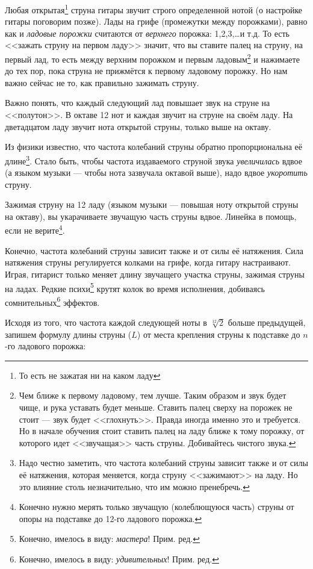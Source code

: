 Любая открытая\footnote{То есть не зажатая ни на каком ладу} струна гитары звучит строго определенной нотой (о настройке гитары поговорим позже). Лады на грифе (промежутки между порожками), равно как и \emph{ладовые порожки} считаются от \emph{верхнего} порожка: 1,2,3,\ldots и т.д. То есть <<зажать струну на первом ладу>> значит, что вы ставите палец на струну, на первый лад, то есть между верхним порожком и первым ладовым\footnote{Чем ближе к первому ладовому, тем лучше. Таким образом и звук будет чище, и рука уставать будет меньше. Ставить палец сверху на порожек не стоит --- звук будет <<глохнуть>>. Правда иногда именно это и требуется. Но в начале обучения стоит ставить палец на ладу ближе к тому порожку, от которого идет <<звучащая>> часть струны. Добивайтесь чистого звука.} и нажимаете до тех пор, пока струна не прижмётся к первому ладовому порожку. Но нам важно сейчас не то, как правильно зажимать струну. 

Важно понять, что каждый следующий лад повышает звук на струне на <<полутон>>. В октаве 12 нот и каждая звучит на струне на своём ладу. На дветадцатом ладу звучит нота открытой струны, только выше на октаву.

Из физики известно, что частота колебаний струны обратно пропорциональна её длине\footnote{Надо честно заметить, что частота колебаний струны зависит также и от силы её натяжения, которая меняется, когда струну <<зажимают>> на ладу. Но это влияние столь незначительно, что им можно пренебречь.}. Стало быть, чтобы частота издаваемого струной звука \emph{увеличилась} вдвое (а языком музыки --- чтобы нота зазвучала октавой выше), надо вдвое \emph{укоротить} струну. 

Зажимая струну на 12 ладу (языком музыки --- повышая ноту открытой струны на октаву), вы укарачиваете звучащую часть струны вдвое. Линейка в помощь, если не верите\footnote{Конечно нужно мерять только звучащую (колеблющуюся часть) струны от опоры на подставке до 12-го ладового порожка.}.

Конечно, частота колебаний струны зависит также и от силы её натяжения. Сила натяжения струны регулируется колками на грифе, когда гитару настраивают. Играя, гитарист только меняет длину звучащего участка струны, зажимая струны на ладах. Редкие психи\footnote{Конечно, имелось в виду: \emph{мастера}! Прим. ред.} крутят колок во время исполнения, добиваясь сомнительных\footnote{Конечно, имелось в виду: \emph{удивительных}! Прим. ред.} эффектов.

Исходя из того, что частота каждой следующей ноты в $\sqrt[12]{2}$ больше предыдущей, запишем формулу длины струны ($L$) от места крепления струны к подставке до $n$-го ладового порожка:

